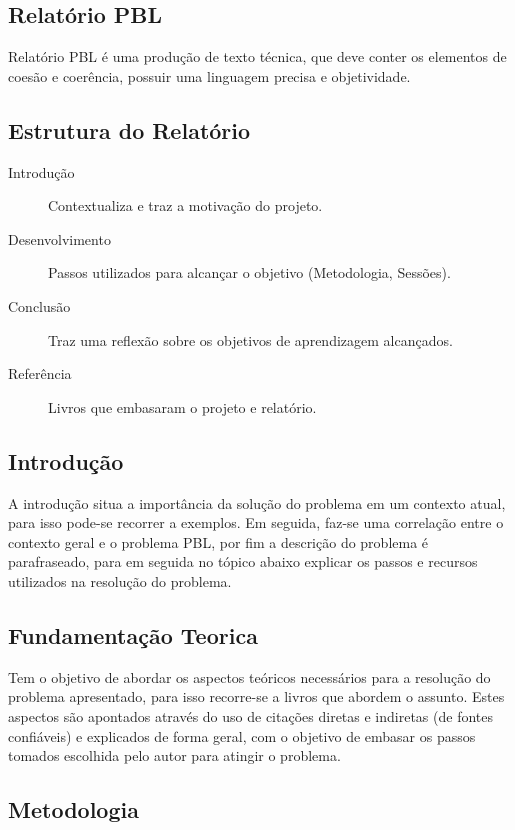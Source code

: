 \documentclass[12pt]{article}
\begin{document}
\subsection{Relatório PBL}

Relatório PBL é uma produção de texto técnica, que deve conter os elementos de coesão e coerência, possuir uma linguagem precisa e objetividade.

\subsection{Estrutura do Relatório}

\begin{description}
   \item[Introdução] Contextualiza e traz a motivação do projeto.
   \item[Desenvolvimento] Passos utilizados para alcançar o objetivo (Metodologia, Sessões).
   \item[Conclusão] Traz uma reflexão sobre os objetivos de aprendizagem alcançados.
   \item[Referência] Livros que embasaram o projeto e relatório.
 \end{description}

\subsection{Introdução}

A introdução situa a importância da solução do problema em um contexto atual, para isso pode-se recorrer
a exemplos. Em seguida, faz-se uma correlação entre o contexto geral e o problema PBL, por fim a descrição do problema é parafraseado, para em seguida no tópico abaixo explicar os passos e recursos utilizados na resolução do problema.

\subsection{Fundamentação Teorica}

Tem o objetivo de abordar os aspectos teóricos necessários para a resolução do problema apresentado, para isso recorre-se a livros que abordem o assunto. Estes aspectos são apontados através do uso de citações diretas e indiretas (de fontes confiáveis) e explicados de forma geral, com o objetivo de embasar os passos tomados escolhida pelo autor para atingir o problema.

\subsection{Metodologia}
\end{document}
